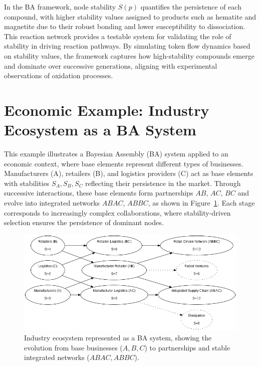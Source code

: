 \documentclass[preprint,12pt]{elsarticle}
\begin{document}
In the BA framework, node stability \(S(p)\) quantifies the persistence of each compound, with higher stability values assigned to products such as hematite and magnetite due to their robust bonding and lower susceptibility to dissociation. This reaction network provides a testable system for validating the role of stability in driving reaction pathways. By simulating token flow dynamics based on stability values, the framework captures how high-stability compounds emerge and dominate over successive generations, aligning with experimental observations of oxidation processes.




\section{Economic Example: Industry Ecosystem as a BA System}

This example illustrates a Bayesian Assembly (BA) system applied to an economic context, where base elements represent different types of businesses. Manufacturers (A), retailers (B), and logistics providers (C) act as base elements with stabilities \( S_A, S_B, S_C \) reflecting their persistence in the market. Through successive interactions, these base elements form partnerships \( AB \), \( AC \), \( BC \) and evolve into integrated networks \( ABAC \), \( ABBC \), as shown in Figure~\ref{fig:figure_9}. Each stage corresponds to increasingly complex collaborations, where stability-driven selection ensures the persistence of dominant nodes. 

\begin{figure}[h]
    \centering
    \includegraphics[width=1\textwidth]{figure_9.png}
    \caption{Industry ecosystem represented as a BA system, showing the evolution from base businesses (\( A, B, C \)) to partnerships and stable integrated networks (\( ABAC, ABBC \)).}
    \label{fig:figure_9}
\end{figure}
\end{document}
